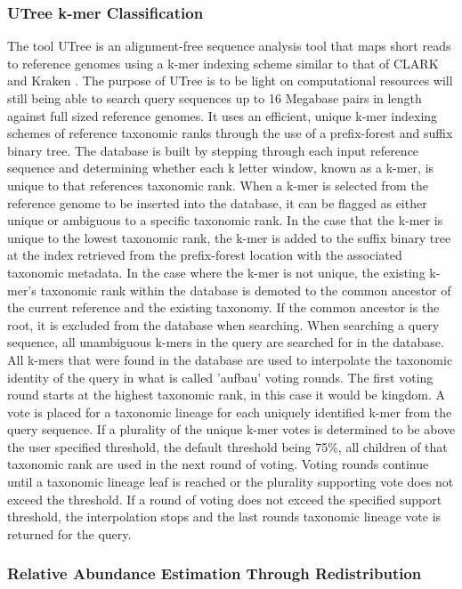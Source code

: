 \subsubsection{UTree k-mer Classification}

The tool UTree is an alignment-free sequence analysis tool that maps short reads to reference genomes using a k-mer indexing scheme similar to that of CLARK \cite{ounit_higher_2015} and Kraken \cite{wood_kraken:_2014}. The purpose of UTree is to be light on computational resources will still being able to search query sequences up to 16 Megabase pairs in length against full sized reference genomes. It uses an efficient, unique k-mer indexing schemes of reference taxonomic ranks through the use of a prefix-forest and suffix binary tree. The database is built by stepping through each input reference sequence and determining whether each k letter window, known as a k-mer, is unique to that references taxonomic rank. When a k-mer is selected from the reference genome to be inserted into the database, it can be flagged as either unique or ambiguous to a specific taxonomic rank. In the case that the k-mer is unique to the lowest taxonomic rank, the k-mer is added to the suffix binary tree at the index retrieved from the prefix-forest location with the associated taxonomic metadata. In the case where the k-mer is not unique, the existing k-mer's taxonomic rank within the database is demoted to the common ancestor of the current reference and the existing taxonomy. If the common ancestor is the root, it is excluded from the database when searching. When searching a query sequence, all unambiguous k-mers in the query are searched for in the database. All k-mers that were found in the database are used to interpolate the taxonomic identity of the query in what is called 'aufbau' voting rounds. The first voting round starts at the highest taxonomic rank, in this case it would be kingdom. A vote is placed for a taxonomic lineage for each uniquely identified k-mer from the query sequence. If a plurality of the unique k-mer votes is determined to be above the user specified threshold, the default threshold being 75\%, all children of that taxonomic rank are used in the next round of voting. Voting rounds continue until a taxonomic lineage leaf is reached or the plurality supporting vote does not exceed the threshold. If a round of voting does not exceed the specified support threshold, the interpolation stops and the last rounds taxonomic lineage vote is returned for the query.

\subsubsection{Relative Abundance Estimation Through Redistribution}

